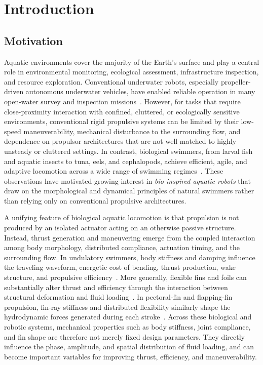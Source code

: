 
\chapter{Introduction} \label{secIntro}

\section{Motivation}
\label{sec:intro_motivation}

Aquatic environments cover the majority of the Earth's surface and play a central role in environmental monitoring, ecological assessment, infrastructure inspection, and resource exploration. Conventional underwater robots, especially propeller-driven autonomous underwater vehicles, have enabled reliable operation in many open-water survey and inspection missions~\cite{yuh2000design}. However, for tasks that require close-proximity interaction with confined, cluttered, or ecologically sensitive environments, conventional rigid propulsive systems can be limited by their low-speed maneuverability, mechanical disturbance to the surrounding flow, and dependence on propulsor architectures that are not well matched to highly unsteady or cluttered settings. In contrast, biological swimmers, from larval fish and aquatic insects to tuna, eels, and cephalopods, achieve efficient, agile, and adaptive locomotion across a wide range of swimming regimes~\cite{sfakiotakis1999review,lauder2006learning,fish2013advantages,fish2006passive,li2022comprehensive,sun2022recent}. These observations have motivated growing interest in \emph{bio-inspired aquatic robots} that draw on the morphological and dynamical principles of natural swimmers rather than relying only on conventional propulsive architectures.

A unifying feature of biological aquatic locomotion is that propulsion is not produced by an isolated actuator acting on an otherwise passive structure. Instead, thrust generation and maneuvering emerge from the coupled interaction among body morphology, distributed compliance, actuation timing, and the surrounding flow. In undulatory swimmers, body stiffness and damping influence the traveling waveform, energetic cost of bending, thrust production, wake structure, and propulsive efficiency~\cite{long_stiffness_1992,john_h_long_importance_1996,tytell2010interactions,tytell2016role}. More generally, flexible fins and foils can substantially alter thrust and efficiency through the interaction between structural deformation and fluid loading~\cite{daniel_flexible_2002,dewey_scaling_2013,floryan_distributed_2020}. In pectoral-fin and flapping-fin propulsion, fin-ray stiffness and distributed flexibility similarly shape the hydrodynamic forces generated during each stroke~\cite{tangorra2010effect,aiello2018relationship,nguyen2017curvature}. Across these biological and robotic systems, mechanical properties such as body stiffness, joint compliance, and fin shape are therefore not merely fixed design parameters. They directly influence the phase, amplitude, and spatial distribution of fluid loading, and can become important variables for improving thrust, efficiency, and maneuverability.

